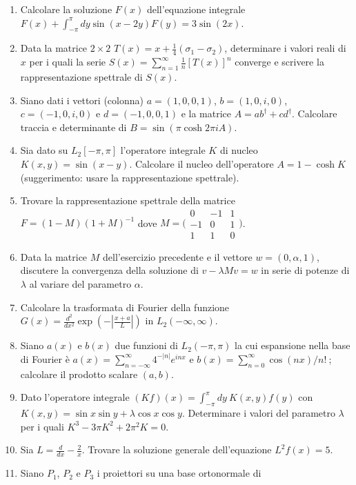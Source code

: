 \documentclass[a4paper,10pt]{article}
\begin{document}
\begin{enumerate}
\item Calcolare la soluzione $F(x)$ dell'equazione integrale
$F(x) + \int_{-\pi}^{\pi} dy \sin(x-2y) F(y) = 3 \sin(2x)$.
\item Data la matrice $2\times 2$ 
$T(x) = x + \frac{1}{4} ( \sigma_1 - \sigma_2 )$, determinare
i valori reali di $x$  per i quali la serie 
$S(x) = \sum_{n=1}^\infty \frac{1}{n} [T(x)]^n$ converge e 
scrivere la rappresentazione spettrale di $S(x)$.
\item Siano dati i vettori (colonna)
$a=(1,0,0,1)$, $b=(1,0,i,0)$, $c=(-1,0,i,0)$ e $d=(-1,0,0,1)$ e
la matrice $A = a b^\dag + c d^\dag$. 
Calcolare traccia e determinante di $B = \sin(\pi \cosh 2\pi i A )$.
\item Sia dato su $L_2[-\pi,\pi]$ l'operatore integrale $K$ di nucleo
$K(x,y) = \sin(x-y)$. Calcolare il nucleo dell'operatore $A = 1-\cosh K$
(suggerimento: usare la rappresentazione spettrale).
\item Trovare la rappresentazione spettrale della matrice $F=(1-M)(1+M)^{-1}$
dove 
$M=\bigl( \begin{smallmatrix} 0 & -1 & 1 \\ 
-1 & 0 & 1 \\ 1 & 1 & 0 \end{smallmatrix} \bigr)$.
\item Data la matrice $M$ dell'esercizio precedente e il vettore 
$w=(0,\alpha,1)$,
discutere la convergenza della soluzione di $v - \lambda M v = w$ in
serie di potenze di $\lambda$ al variare del parametro $\alpha$.
\item Calcolare la trasformata di Fourier della funzione 
$G(x) = \frac{d^2}{dx^2} \exp( -|\frac{x+a}{L}| )$ in $L_2(-\infty,\infty)$.
\item Siano $a(x)$ e $b(x)$ due funzioni di $L_2(-\pi,\pi)$ la cui
espansione nella base di Fourier \`e 
$a(x)=\sum_{n=-\infty}^\infty 4^{-|n|} e^{inx}$
e $b(x) = \sum_{n=0}^{\infty} \cos (nx) / n! \ $;
calcolare il prodotto scalare $(a,b)$.
\item Dato l'operatore integrale $(Kf)(x)=\int_{-\pi}^\pi dy \ K(x,y) f (y)$
con $K(x,y)=\sin x \sin y + \lambda \cos x \cos y$. Determinare i
valori del parametro $\lambda$ per i quali $K^3-3 \pi K^2 + 2 \pi^2 K =0$.
\item Sia $L = \frac{d}{dx} - \frac{2}{x}$. Trovare la soluzione generale 
dell'equazione $L^2 f(x) = 5$.
\item Siano $P_1$, $P_2$ e $P_3$ i proiettori su una base ortonormale di 

\end{enumerate}
\end{document}
